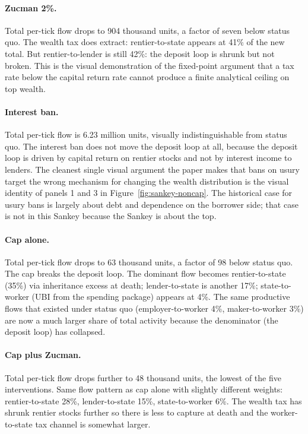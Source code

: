 \documentclass[11pt]{article}
\begin{document}
\paragraph{Zucman 2\%.}  Total per-tick flow drops to 904 thousand
units, a factor of seven below status quo.  The wealth tax does
extract: rentier-to-state appears at 41\% of the new total.  But
rentier-to-lender is still 42\%: the deposit loop is shrunk but
not broken.  This is the visual demonstration of the
\citet{benhabib2011distribution} fixed-point argument that a tax
rate below the capital return rate cannot produce a finite
analytical ceiling on top wealth.

\paragraph{Interest ban.}  Total per-tick flow is 6.23 million
units, visually indistinguishable from status quo.  The interest
ban does not move the deposit loop at all, because the deposit
loop is driven by capital return on rentier stocks and not by
interest income to lenders.  The cleanest single visual argument
the paper makes that bans on usury target the wrong mechanism
for changing the wealth distribution is the visual identity of
panels 1 and 3 in Figure~\ref{fig:sankey-noncap}.  The historical
case for usury bans is largely about debt and dependence on the
borrower side; that case is not in this Sankey because the
Sankey is about the top.

\paragraph{Cap alone.}  Total per-tick flow drops to 63 thousand
units, a factor of 98 below status quo.  The cap breaks the
deposit loop.  The dominant flow becomes rentier-to-state (35\%)
via inheritance excess at death; lender-to-state is another
17\%; state-to-worker (UBI from the spending package) appears at
4\%.  The same productive flows that existed under status quo
(employer-to-worker 4\%, maker-to-worker 3\%) are now a much
larger share of total activity because the denominator (the
deposit loop) has collapsed.

\paragraph{Cap plus Zucman.}  Total per-tick flow drops further
to 48 thousand units, the lowest of the five interventions.
Same flow pattern as cap alone with slightly different weights:
rentier-to-state 28\%, lender-to-state 15\%, state-to-worker 6\%.
The wealth tax has shrunk rentier stocks further so there is less
to capture at death and the worker-to-state tax channel is
somewhat larger.
\end{document}
